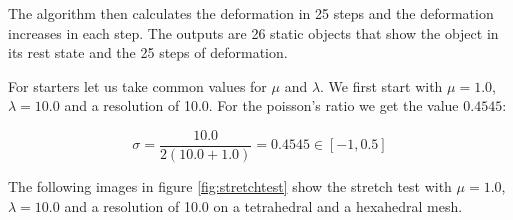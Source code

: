 The algorithm then calculates the deformation in 25 steps and the deformation increases in each step. The outputs are 26 static objects that show the object in its rest state and the 25 steps of deformation.



For starters let us take common values for $\mu$ and $\lambda$. We first start with $\mu = 1.0$, $\lambda = 10.0$ and a resolution of 10.0. For the poisson's ratio we get the value $0.4545$:

\[ \sigma =  \frac{10.0}{2 (10.0 + 1.0)} = 0.4545 \in [-1, 0.5] \]


The following images in figure \ref{fig:stretchtest} show the stretch test with $\mu = 1.0$, $\lambda = 10.0$ and a resolution of 10.0 on a tetrahedral and a hexahedral mesh.


